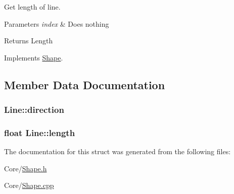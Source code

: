 Get length of line. 


\begin{DoxyParams}{Parameters}
{\em index} & Does nothing \\
\hline
\end{DoxyParams}
\begin{DoxyReturn}{Returns}
Length 
\end{DoxyReturn}


Implements \hyperlink{structShape_a878528c42f14532e5fadc9ace7024f68}{Shape}.



\subsection{Member Data Documentation}
\subsubsection[{\texorpdfstring{direction}{direction}}]{ Line\+::direction}\hypertarget{structLine_ae63ba0eae1b8a7b0a3786328bcb4992d}{}\label{structLine_ae63ba0eae1b8a7b0a3786328bcb4992d}
\subsubsection[{\texorpdfstring{length}{length}}]{\setlength{\rightskip}{0pt plus 5cm}float Line\+::length}\hypertarget{structLine_ab7e2334c25ca3ea59df0ef559bd88143}{}\label{structLine_ab7e2334c25ca3ea59df0ef559bd88143}


The documentation for this struct was generated from the following files\+:\begin{DoxyCompactItemize}
\item 
Core/\hyperlink{Shape_8h}{Shape.\+h}\item 
Core/\hyperlink{Shape_8cpp}{Shape.\+cpp}\end{DoxyCompactItemize}
